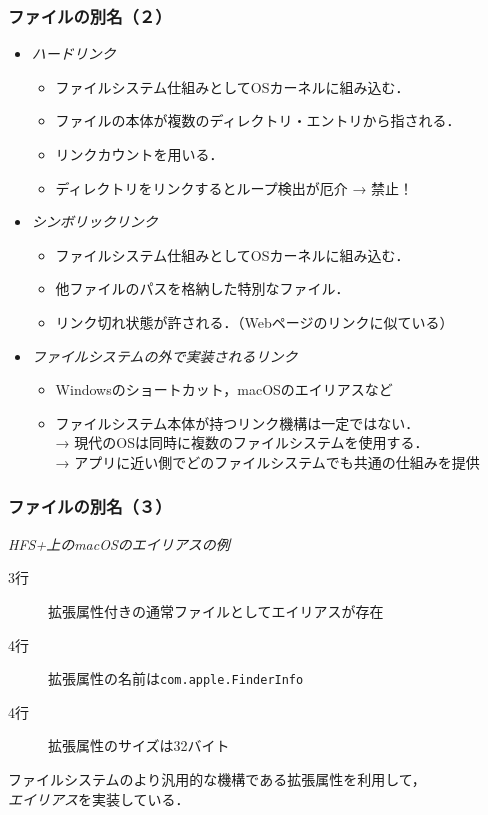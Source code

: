 \documentclass{beamer}                   %
\begin{document}
\begin{frame}
  \frametitle{ファイルの別名（２）}
  \begin{itemize}
  \item \emph{ハードリンク} \\
    \begin{itemize}
    \item ファイルシステム仕組みとしてOSカーネルに組み込む．
    \item ファイルの本体が複数のディレクトリ・エントリから指される．
    \item リンクカウントを用いる．
    \item ディレクトリをリンクするとループ検出が厄介 → 禁止！
    \end{itemize}
  \item \emph{シンボリックリンク} \\
    \begin{itemize}
    \item ファイルシステム仕組みとしてOSカーネルに組み込む．
    \item 他ファイルのパスを格納した特別なファイル．
    \item リンク切れ状態が許される．（Webページのリンクに似ている）
    \end{itemize}
  \item \emph{ファイルシステムの外で実装されるリンク} \\
    \begin{itemize}
    \item Windowsのショートカット，macOSのエイリアスなど
    \item ファイルシステム本体が持つリンク機構は一定ではない． \\
      → 現代のOSは同時に複数のファイルシステムを使用する．\\
      → アプリに近い側でどのファイルシステムでも共通の仕組みを提供
    \end{itemize}
  \end{itemize}
\end{frame}

\begin{frame}
  \frametitle{ファイルの別名（３）}
  \emph{HFS+上のmacOSのエイリアスの例}
  \begin{description}
    \item[3行] 拡張属性付きの通常ファイルとしてエイリアスが存在
    \item[4行] 拡張属性の名前は\texttt{com.apple.FinderInfo}
    \item[4行] 拡張属性のサイズは32バイト
  \end{description}
  ファイルシステムのより汎用的な機構である拡張属性を利用して，\\
  \emph{エイリアス}を実装している．
  \vfill
\end{frame}
\end{document}
